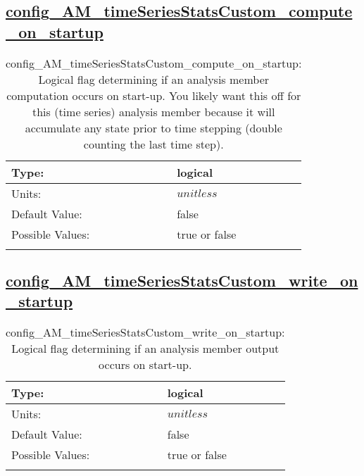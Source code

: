 \subsection[config\_AM\_timeSeriesStatsCustom\_compute\_on\_startup]{\hyperref[sec:nm_tab_AM_timeSeriesStatsCustom]{config\_AM\_timeSeriesStatsCustom\_compute\_on\_startup}}
\label{subsec:nm_sec_config_AM_timeSeriesStatsCustom_compute_on_startup}
\begin{center}
\begin{longtable}{| p{2.0in} || p{4.0in} |}
    \hline
    Type: & logical \\
    \hline
    Units: & $unitless$ \\
    \hline
    Default Value: & false \\
    \hline
    Possible Values: & true or false \\
    \hline
    \caption{config\_AM\_timeSeriesStatsCustom\_compute\_on\_startup: Logical flag determining if an analysis member computation occurs on start-up. You likely want this off for this (time series) analysis member because it will accumulate any state prior to time stepping (double counting the last time step).}
\end{longtable}
\end{center}
\subsection[config\_AM\_timeSeriesStatsCustom\_write\_on\_startup]{\hyperref[sec:nm_tab_AM_timeSeriesStatsCustom]{config\_AM\_timeSeriesStatsCustom\_write\_on\_startup}}
\label{subsec:nm_sec_config_AM_timeSeriesStatsCustom_write_on_startup}
\begin{center}
\begin{longtable}{| p{2.0in} || p{4.0in} |}
    \hline
    Type: & logical \\
    \hline
    Units: & $unitless$ \\
    \hline
    Default Value: & false \\
    \hline
    Possible Values: & true or false \\
    \hline
    \caption{config\_AM\_timeSeriesStatsCustom\_write\_on\_startup: Logical flag determining if an analysis member output occurs on start-up.}
\end{longtable}
\end{center}
